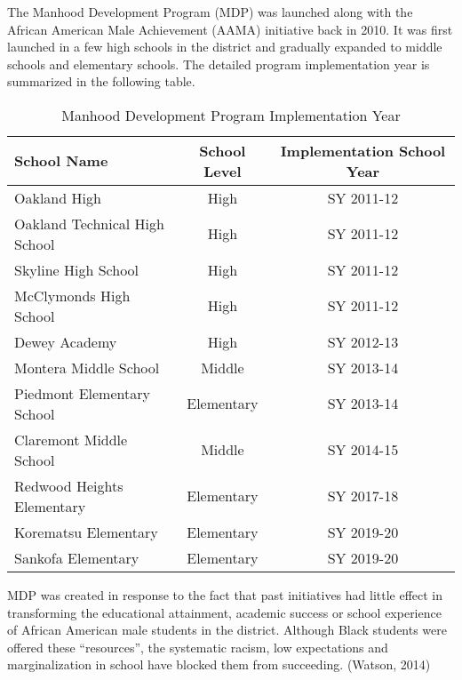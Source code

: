 The Manhood Development Program (MDP) was launched along with the African American Male Achievement (AAMA) initiative back in 2010. It was first launched in a few high schools in the district and gradually expanded to middle schools and elementary schools. The detailed program implementation year is summarized in the following table. 

\begin{table}[H]
  \begin{center}
    \caption{Manhood Development Program Implementation Year}
    \label{tab:table1}
    \renewcommand{\arraystretch}{1.5}
    \begin{tabular}{l c c} %
      \hline
      \textbf{School Name} & \textbf{School Level} & \textbf{Implementation School Year}\\
      \hline
      Oakland High & High & SY 2011-12\\
      Oakland Technical High School & High & SY 2011-12\\
      Skyline High School & High & SY 2011-12\\
      McClymonds High School & High & SY 2011-12\\
      Dewey Academy & High & SY 2012-13\\
      Montera Middle School & Middle & SY 2013-14\\
      Piedmont Elementary School & Elementary & SY 2013-14\\
      Claremont Middle School & Middle & SY 2014-15\\
      Redwood Heights Elementary & Elementary & SY 2017-18\\
      Korematsu Elementary & Elementary & SY 2019-20\\
      Sankofa Elementary & Elementary & SY 2019-20\\
      \hline
    \end{tabular}
  \end{center}
\end{table}

MDP was created in response to the fact that past initiatives had little effect in transforming the educational attainment, academic success or school experience of African American male students in the district. Although Black students were offered these “resources”, the systematic racism, low expectations and marginalization in school have blocked them from succeeding. (Watson, 2014)

